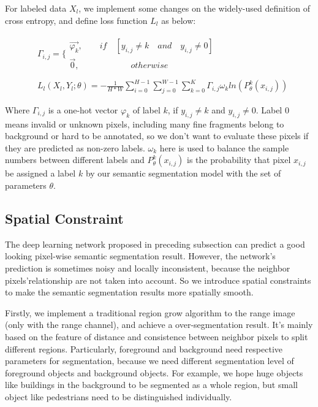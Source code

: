 For labeled data $X_l$, we implement some changes on the widely-used definition of cross entropy, and define loss function $L_l$ as below:

\begin{equation}
\begin{split}
&\varGamma_{i,j}=\{
\begin{array}{lr}
\overrightarrow{\varphi_k} ,\quad\quad if \quad [y_{i,j}\neq k \quad and\quad y_{i,j}\neq0]	\\
\overrightarrow{0} ,\quad\quad\quad\quad\quad\quad  otherwise
\end{array}	\\
\\
&\textit{}L_l(X_l,Y_l;\theta)=-\frac{1}{H*W}\sum_{i=0}^{H-1}\sum_{j=0}^{W-1}\sum_{k=0}^K{\varGamma_{i,j}\omega_{k}ln(P^k_{\theta}(x_{i,j}))}
\end{split}
\end{equation}

Where $\varGamma_{i,j}$ is a one-hot vector $\varphi_k$ of label $k$, if $y_{i,j}\neq k$ and $y_{i,j}\neq0$. Label 0 means invalid or unknown pixels, including many fine fragments belong to background or hard to be annotated, so we don't want to evaluate these pixels if they are predicted as non-zero labels. $\omega_{k}$ here is used to balance the sample numbers between different labels and $P^k_{\theta}(x_{i,j})$ is the probability that pixel $x_{i,j}$ be assigned a label $k$ by our semantic segmentation model with the set of parameters $\theta$.


\subsection{Spatial Constraint}
The deep learning network proposed in preceding subsection can predict a good looking pixel-wise semantic segmentation result. However, the network's prediction is sometimes noisy and locally inconsistent, because the neighbor pixels'relationship are not taken into account. So we introduce spatial constraints to make the semantic segmentation results more spatially smooth.


Firstly, we implement a traditional region grow algorithm to the range image (only with the range channel), and achieve a over-segmentation result. It's mainly based on the feature of distance and consistence between neighbor pixels to split different regions. Particularly, foreground and background need respective parameters for segmentation, because we need different segmentation level of foreground objects and background objects. For example, we hope huge objects like buildings in the background to be segmented as a whole region, but small object like pedestrians need to be distinguished individually.

